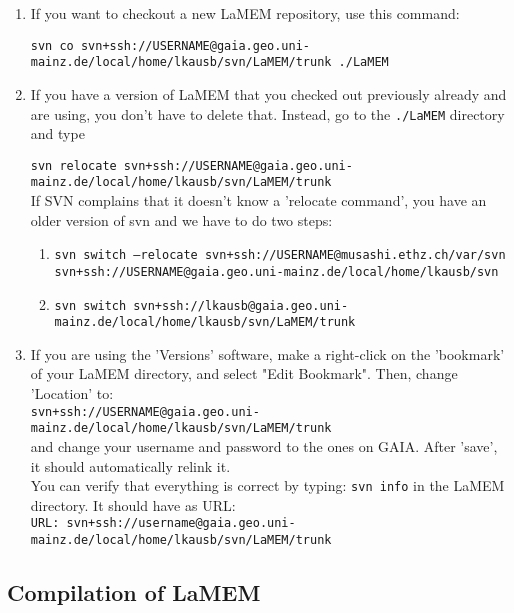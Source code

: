 \documentclass[a4paper,11pt]{article}
\begin{document}
\begin{enumerate}
\item If you want to checkout a new LaMEM repository, use this command:

\indent \texttt{\footnotesize svn co svn+ssh://USERNAME@gaia.geo.uni-mainz.de/local/home/lkausb/svn/LaMEM/trunk ./LaMEM}

\item If you have a version of LaMEM that you checked out previously already and are using, you don't have to delete that. Instead, go to the \texttt{./LaMEM} directory and type

\indent \texttt{\footnotesize svn relocate svn+ssh://USERNAME@gaia.geo.uni-mainz.de/local/home/lkausb/svn/LaMEM/trunk}\\

If SVN complains that it doesn't know a 'relocate command', you have an older version of svn and we have to do two steps:

\begin{enumerate}
\item \texttt{\tiny svn switch --relocate svn+ssh://USERNAME@musashi.ethz.ch/var/svn svn+ssh://USERNAME@gaia.geo.uni-mainz.de/local/home/lkausb/svn}
\item \texttt{\scriptsize svn switch svn+ssh://lkausb@gaia.geo.uni-mainz.de/local/home/lkausb/svn/LaMEM/trunk}
\end{enumerate}

\item If you are using  the 'Versions' software, make a right-click on the 'bookmark' of your LaMEM directory, and select "Edit Bookmark". Then, change 'Location' to:\\
\indent \texttt{\footnotesize svn+ssh://USERNAME@gaia.geo.uni-mainz.de/local/home/lkausb/svn/LaMEM/trunk}\\
and change your username and password to the ones on GAIA. After 'save', it should automatically relink it.\\

You can verify that everything is correct by typing:
\indent \texttt{svn info} in the LaMEM directory. It should have as URL:\\
\indent \texttt{\footnotesize URL: svn+ssh://username@gaia.geo.uni-mainz.de/local/home/lkausb/svn/LaMEM/trunk}

\end{enumerate}

\subsection{Compilation of LaMEM}
\end{document}
